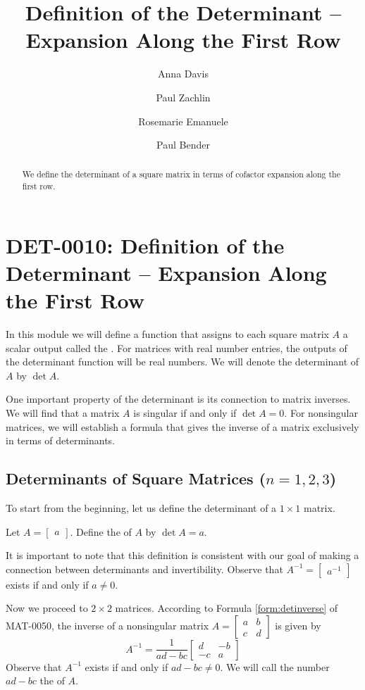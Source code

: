 \documentclass{ximera}
\author{Anna Davis \and Paul Zachlin \and Rosemarie Emanuele \and Paul Bender} \title{Definition of the Determinant -- Expansion Along the First Row} \license{CC-BY 4.0}
\begin{document}
\begin{abstract}
 We define the determinant of a square matrix in terms of cofactor expansion along the first row.
\end{abstract}
\maketitle

\section*{DET-0010: Definition of the Determinant -- Expansion Along the First Row}
In this module we will define a function that assigns to each square matrix $A$ a scalar output called the .  For matrices with real number entries, the outputs of the determinant function will be real numbers.  We will denote the determinant of $A$ by $\det{A}$.  

One important property of the determinant is its connection to matrix inverses.  We will find that a matrix $A$ is singular if and only if $\det{A}=0$.  For nonsingular matrices, we will establish a formula that gives the inverse of a matrix exclusively in terms of determinants.

\subsection*{Determinants of Square Matrices ($n=1,2,3$)}
To start from the beginning, let us define the determinant of a $1\times 1$ matrix.
\begin{definition}\label{def:onebyonedet} Let
$A=\begin{bmatrix}a\end{bmatrix}$.  Define the  of $A$ by $\det{A}=a$.
\end{definition}
It is important to note that this definition is consistent with our goal of making a connection between determinants and invertibility.  Observe that $A^{-1}=\begin{bmatrix}a^{-1}\end{bmatrix}$ exists if and only if $a\neq 0$.

Now we proceed to $2\times 2$ matrices.  According to Formula \ref{form:detinverse} of MAT-0050, the inverse of a nonsingular matrix $A=\begin{bmatrix}a&b\\c&d\end{bmatrix}$ is given by
$$A^{-1}=\frac{1}{ad-bc}\begin{bmatrix}d&-b\\-c&a\end{bmatrix}$$
Observe that $A^{-1}$ exists if and only if $ad-bc\neq 0$.  We will call the number $ad-bc$ the  of $A$.
\end{document}
